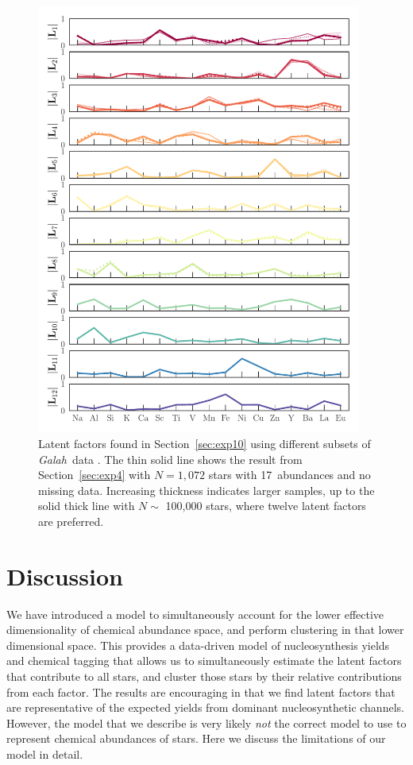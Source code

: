 \documentclass[twocolumn]{aastex62}
\newcommand{\project}[1]{\textsl{#1}}
\newcommand{\Galah}{\project{Galah}}
\newcommand{\ExpThreeNumAbundances}{17}
\begin{document}
\begin{figure}[t!]
	\includegraphics[width=0.95\textwidth]{experiments/exp10-comparison.pdf}
	\caption{Latent factors found in Section~\ref{sec:exp10} using different subsets
	         of \Galah\ data \citep{Buder:2018}. The thin solid line shows the result from
	         Section~\ref{sec:exp4} with $N=1,072$ stars with \ExpThreeNumAbundances\ abundances and no
	         missing data. Increasing thickness indicates larger samples, up to the solid thick line with $N \sim$ 100,000 stars, where twelve latent factors are preferred.}
    \label{fig:exp10-comparison}
\end{figure}



\section{Discussion} \label{sec:discussion}

We have introduced a model to simultaneously account for the lower
effective dimensionality of chemical abundance space, and perform clustering
in that lower dimensional space. This provides a data-driven model of
nucleosynthesis yields and chemical tagging that allows us to simultaneously
estimate the latent factors that contribute to all stars, and cluster those 
stars by their relative contributions from each factor. The results are
encouraging in that we find latent factors that are representative of the
expected yields from dominant nucleosynthetic channels. However, the model that
we describe is very likely \emph{not} the correct model to use to represent 
chemical abundances of stars. Here we discuss the limitations of our model 
in detail.
\end{document}
